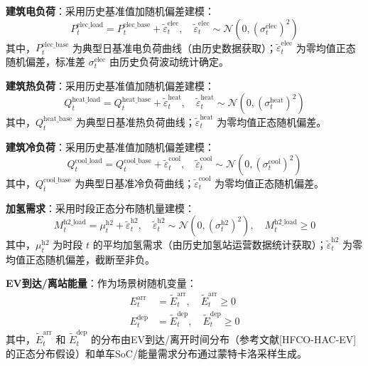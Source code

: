 \documentclass[11pt]{ctexart}
\begin{document}
\textbf{建筑电负荷}：采用历史基准值加随机偏差建模：
\begin{equation}
P_{t}^{\text{elec\_load}} = P_{t}^{\text{elec\_base}} + \tilde{\varepsilon}_{t}^{\text{elec}}, \quad \tilde{\varepsilon}_{t}^{\text{elec}} \sim \mathcal{N}(0, (\sigma_{t}^{\text{elec}})^{2})
\end{equation}
其中，$P_{t}^{\text{elec\_base}}$ 为典型日基准电负荷曲线（由历史数据获取）；$\tilde{\varepsilon}_{t}^{\text{elec}}$ 为零均值正态随机偏差，标准差 $\sigma_{t}^{\text{elec}}$ 由历史负荷波动统计确定。

\textbf{建筑热负荷}：采用历史基准值加随机偏差建模：
\begin{equation}
Q_{t}^{\text{heat\_load}} = Q_{t}^{\text{heat\_base}} + \tilde{\varepsilon}_{t}^{\text{heat}}, \quad \tilde{\varepsilon}_{t}^{\text{heat}} \sim \mathcal{N}(0, (\sigma_{t}^{\text{heat}})^{2})
\end{equation}
其中，$Q_{t}^{\text{heat\_base}}$ 为典型日基准热负荷曲线；$\tilde{\varepsilon}_{t}^{\text{heat}}$ 为零均值正态随机偏差。

\textbf{建筑冷负荷}：采用历史基准值加随机偏差建模：
\begin{equation}
Q_{t}^{\text{cool\_load}} = Q_{t}^{\text{cool\_base}} + \tilde{\varepsilon}_{t}^{\text{cool}}, \quad \tilde{\varepsilon}_{t}^{\text{cool}} \sim \mathcal{N}(0, (\sigma_{t}^{\text{cool}})^{2})
\end{equation}
其中，$Q_{t}^{\text{cool\_base}}$ 为典型日基准冷负荷曲线；$\tilde{\varepsilon}_{t}^{\text{cool}}$ 为零均值正态随机偏差。

\textbf{加氢需求}：采用时段正态分布随机量建模：
\begin{equation}
M_{t}^{\text{h2\_load}} = \mu_{t}^{\text{h2}} + \tilde{\varepsilon}_{t}^{\text{h2}}, \quad \tilde{\varepsilon}_{t}^{\text{h2}} \sim \mathcal{N}(0, (\sigma_{t}^{\text{h2}})^{2}), \quad M_{t}^{\text{h2\_load}} \ge 0
\end{equation}
其中，$\mu_{t}^{\text{h2}}$ 为时段 $t$ 的平均加氢需求（由历史加氢站运营数据统计获取）；$\tilde{\varepsilon}_{t}^{\text{h2}}$ 为零均值正态随机偏差，截断至非负。

\textbf{EV到达/离站能量}：作为场景树随机变量：
\begin{align}
E_{t}^{\text{arr}} & = \tilde{E}_{t}^{\text{arr}}, \quad \tilde{E}_{t}^{\text{arr}} \ge 0 \\
E_{t}^{\text{dep}} & = \tilde{E}_{t}^{\text{dep}}, \quad \tilde{E}_{t}^{\text{dep}} \ge 0
\end{align}
其中，$\tilde{E}_{t}^{\text{arr}}$ 和 $\tilde{E}_{t}^{\text{dep}}$ 的分布由EV到达/离开时间分布（参考文献[HFCO-HAC-EV]的正态分布假设）和单车SoC/能量需求分布通过蒙特卡洛采样生成。
\end{document}
